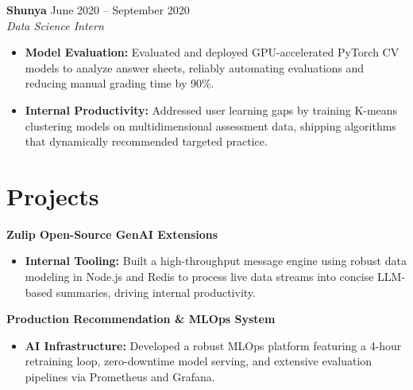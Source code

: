 \documentclass[11pt,a4paper]{article}
\begin{document}
\vspace{3pt}
\noindent
\textbf{Shunya} \hfill June 2020 -- September 2020 \\
\textit{Data Science Intern}
\begin{itemize}[leftmargin=*,noitemsep,topsep=0pt]
    \item \textbf{Model Evaluation:} Evaluated and deployed GPU-accelerated PyTorch CV models to analyze answer sheets, reliably automating evaluations and reducing manual grading time by 90\%.
    \item \textbf{Internal Productivity:} Addressed user learning gaps by training K-means clustering models on multidimensional assessment data, shipping algorithms that dynamically recommended targeted practice.
\end{itemize}

\vspace{-5pt}
\section{Projects}
\noindent
\textbf{Zulip Open-Source GenAI Extensions}
\begin{itemize}[leftmargin=*,noitemsep,topsep=0pt]
    \item \textbf{Internal Tooling:} Built a high-throughput message engine using robust data modeling in Node.js and Redis to process live data streams into concise LLM-based summaries, driving internal productivity.
\end{itemize}

\vspace{3pt}
\noindent
\textbf{Production Recommendation \& MLOps System}
\begin{itemize}[leftmargin=*,noitemsep,topsep=0pt]
    \item \textbf{AI Infrastructure:} Developed a robust MLOps platform featuring a 4-hour retraining loop, zero-downtime model serving, and extensive evaluation pipelines via Prometheus and Grafana.
\end{itemize}
\end{document}
